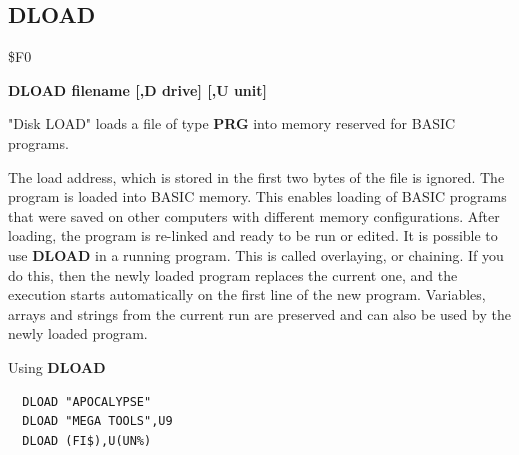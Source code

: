 
\newpage
\subsection{DLOAD}
\begin{description}[leftmargin=2cm,style=nextline]
\item [Token:] \$F0
\item [Format:] {\bf DLOAD filename [,D drive] [,U unit] }
\item [Usage:]
   "Disk LOAD" loads a file of type
   {\bf PRG} into memory reserved for BASIC programs.

   \filenamedefinition

   \drivedefinition

   \unitdefinition

\item [Remarks:]
   The load address, which is stored in the first two bytes
   of the file is ignored. The program is loaded into
   BASIC memory. This enables loading of BASIC programs
   that were saved on other computers with different memory
   configurations. After loading, the program is re-linked
   and ready to be run or edited.
   It is possible to use {\bf DLOAD} in a running program. This is
   called overlaying, or chaining.
   If you do this, then the newly loaded program replaces the current one,
   and the execution starts automatically on the first line of the
   new program. Variables, arrays and strings from the current
   run are preserved and can also be used by the newly loaded program.

\item [Examples:] Using {\bf DLOAD}
\begin{tcolorbox}[colback=black,coltext=white]
\verbatimfont{\codefont}
\begin{verbatim}
  DLOAD "APOCALYPSE"
  DLOAD "MEGA TOOLS",U9
  DLOAD (FI$),U(UN%)
\end{verbatim}
\end{tcolorbox}
\end{description}


\newpage
